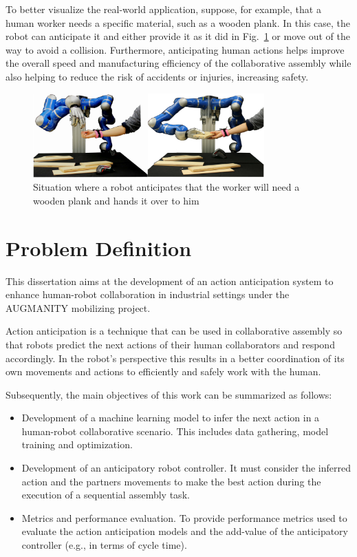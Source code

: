 To better visualize the real-world application, suppose, for example, that a human worker needs a specific material, such as a wooden plank. In this case, the robot can anticipate it and either provide it as it did in Fig.~\ref{example} or move out of the way to avoid a collision. Furthermore, anticipating human actions helps improve the overall speed and manufacturing efficiency of the collaborative assembly while also helping to reduce the risk of accidents or injuries, increasing safety.

\begin{figure}[htbp]
\centerline{\includegraphics[width=3.5in]{figs/example.PNG}}
\caption{Situation where a robot anticipates that the worker will need a wooden plank and hands it over to him \cite{Maeda2016}}
\label{example}
\end{figure}
\fi


\section{Problem Definition}

This dissertation aims at the development of an action anticipation system to enhance human-robot collaboration in industrial settings under the AUGMANITY mobilizing project.

Action anticipation is a technique that can be used in collaborative assembly so that robots predict the next actions of their human collaborators and respond accordingly. In the robot's perspective this results in a better coordination of its own movements and actions to efficiently and safely work with the human.

Subsequently, the main objectives of this work can be summarized as follows:

\begin{itemize}
\item Development of a machine learning model to infer the next action in a human-robot collaborative scenario. This includes data gathering, model training and optimization.
\item Development of an anticipatory robot controller. It must consider the inferred action and the partners movements to make the best action during the execution of a sequential assembly task.
\item Metrics and performance evaluation. To provide performance metrics used to evaluate the action anticipation models and the add-value of the anticipatory controller (e.g., in terms of cycle time).
\end{itemize}

